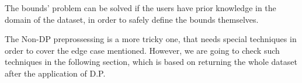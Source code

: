 The bounds' problem can be solved if the users have prior knowledge in the domain of the dataset, in order to safely define the bounds themselves. 

The Non-DP preprossessing is a more tricky one, that needs special techniques in order to cover the edge case mentioned. However, we are going to check such techniques in the following section, which is based on returning the whole dataset after the application of D.P.

